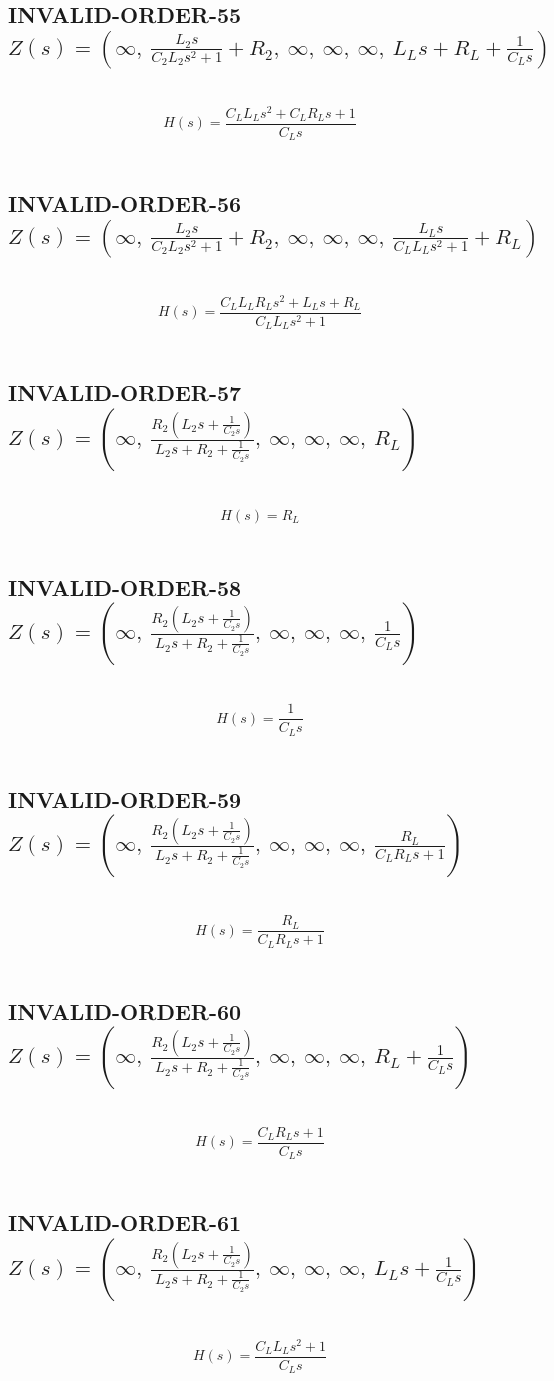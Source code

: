 \documentclass{article}
\begin{document}
\subsection{INVALID-ORDER-55 $Z(s) = \left( \infty, \  \frac{L_{2} s}{C_{2} L_{2} s^{2} + 1} + R_{2}, \  \infty, \  \infty, \  \infty, \  L_{L} s + R_{L} + \frac{1}{C_{L} s}\right)$ } \ 
\textbf{\[H(s) = \frac{C_{L} L_{L} s^{2} + C_{L} R_{L} s + 1}{C_{L} s}\] } \ 
\subsection{INVALID-ORDER-56 $Z(s) = \left( \infty, \  \frac{L_{2} s}{C_{2} L_{2} s^{2} + 1} + R_{2}, \  \infty, \  \infty, \  \infty, \  \frac{L_{L} s}{C_{L} L_{L} s^{2} + 1} + R_{L}\right)$ } \ 
\textbf{\[H(s) = \frac{C_{L} L_{L} R_{L} s^{2} + L_{L} s + R_{L}}{C_{L} L_{L} s^{2} + 1}\] } \ 
\subsection{INVALID-ORDER-57 $Z(s) = \left( \infty, \  \frac{R_{2} \left(L_{2} s + \frac{1}{C_{2} s}\right)}{L_{2} s + R_{2} + \frac{1}{C_{2} s}}, \  \infty, \  \infty, \  \infty, \  R_{L}\right)$ } \ 
\textbf{\[H(s) = R_{L}\] } \ 
\subsection{INVALID-ORDER-58 $Z(s) = \left( \infty, \  \frac{R_{2} \left(L_{2} s + \frac{1}{C_{2} s}\right)}{L_{2} s + R_{2} + \frac{1}{C_{2} s}}, \  \infty, \  \infty, \  \infty, \  \frac{1}{C_{L} s}\right)$ } \ 
\textbf{\[H(s) = \frac{1}{C_{L} s}\] } \ 
\subsection{INVALID-ORDER-59 $Z(s) = \left( \infty, \  \frac{R_{2} \left(L_{2} s + \frac{1}{C_{2} s}\right)}{L_{2} s + R_{2} + \frac{1}{C_{2} s}}, \  \infty, \  \infty, \  \infty, \  \frac{R_{L}}{C_{L} R_{L} s + 1}\right)$ } \ 
\textbf{\[H(s) = \frac{R_{L}}{C_{L} R_{L} s + 1}\] } \ 
\subsection{INVALID-ORDER-60 $Z(s) = \left( \infty, \  \frac{R_{2} \left(L_{2} s + \frac{1}{C_{2} s}\right)}{L_{2} s + R_{2} + \frac{1}{C_{2} s}}, \  \infty, \  \infty, \  \infty, \  R_{L} + \frac{1}{C_{L} s}\right)$ } \ 
\textbf{\[H(s) = \frac{C_{L} R_{L} s + 1}{C_{L} s}\] } \ 
\subsection{INVALID-ORDER-61 $Z(s) = \left( \infty, \  \frac{R_{2} \left(L_{2} s + \frac{1}{C_{2} s}\right)}{L_{2} s + R_{2} + \frac{1}{C_{2} s}}, \  \infty, \  \infty, \  \infty, \  L_{L} s + \frac{1}{C_{L} s}\right)$ } \ 
\textbf{\[H(s) = \frac{C_{L} L_{L} s^{2} + 1}{C_{L} s}\] } \ 
\end{document}
